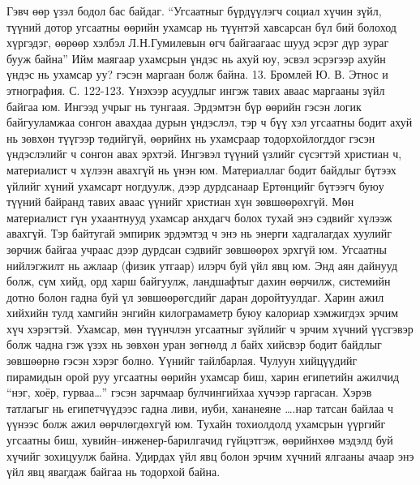 Гэвч өөр үзэл бодол бас байдаг. “Угсаатныг бүрдүүлэгч социал хүчин зүйл, түүний дотор угсаатны өөрийн ухамсар нь түүнтэй хавсарсан бүл бий болоход хүргэдэг, өөрөөр хэлбэл Л.Н.Гумилевын өгч байгаагаас шууд эсрэг дүр зураг бууж байна” Ийм маягаар ухамсрын үндэс нь ахуй юу, эсвэл эсрэгээр ахуйн үндэс нь ухамсар уу? гэсэн маргаан болж байна. 13. Бромлей Ю. В. Этнос и этнография. С. 122-123.
Үнэхээр асуудлыг ингэж тавих аваас маргааны зүйл байгаа юм. Ингээд учрыг нь тунгаая.
Эрдэмтэн бүр өөрийн гэсэн логик байгууламжаа сонгон авахдаа дурын үндэслэл, тэр ч бүү хэл угсаатны бодит ахуй нь зөвхөн түүгээр төдийгүй, өөрийнх нь ухамсраар тодорхойлогддог гэсэн үндэслэлийг ч сонгон авах эрхтэй. Ингэвэл түүний үзлийг сүсэгтэй христиан ч, материалист ч хүлээн авахгүй нь үнэн юм. Материаллаг бодит байдлыг бүтээх үйлийг хүний ухамсарт ногдуулж, дээр дурдсанаар Ертөнцийг бүтээгч буюу түүний байранд тавих аваас үүнийг христиан хүн зөвшөөрөхгүй. Мөн материалист гүн ухаантнууд ухамсар анхдагч болох тухай энэ сэдвийг хүлээж авахгүй.
Тэр байтугай эмпирик эрдэмтэд ч энэ нь энерги хадгалагдах хуулийг зөрчиж байгаа учраас дээр дурдсан сэдвийг зөвшөөрөх эрхгүй юм. Угсаатны нийлэгжилт нь ажлаар (физик утгаар) илэрч буй үйл явц юм. Энд аян дайнууд болж, сүм хийд, орд харш байгуулж, ландшафтыг дахин өөрчилж, системийн дотно болон гадна буй үл зөвшөөрөгсдийг даран доройтуулдаг. Харин ажил хийхийн тулд хамгийн энгийн килограмаметр буюу калориар хэмжигдэх эрчим хүч хэрэгтэй. Ухамсар, мөн түүнчлэн угсаатныг зүйлийг ч эрчим хүчний үүсгэвэр болж чадна гэж үзэх нь зөвхөн уран зөгнөлд л байх хийсвэр бодит байдлыг зөвшөөрнө гэсэн хэрэг болно.
Үүнийг тайлбарлая. Чулуун хийцүүдийг пирамидын орой руу угсаатны өөрийн ухамсар биш, харин египетийн ажилчид “нэг, хоёр, гурваа…” гэсэн зарчмаар булчингийхаа хүчээр гаргасан. Хэрэв татлагыг нь египетчүүдээс гадна ливи, иуби, хананеяне ….нар татсан байлаа ч үүнээс болж ажил өөрчлөгдөхгүй юм. Тухайн тохиолдолд ухамсрын үүргийг угсаатны биш, хувийн–инженер-барилгачид гүйцэтгэж, өөрийнхөө мэдэлд буй хүчийг зохицуулж байна. Удирдах үйл явц болон эрчим хүчний ялгааны ачаар энэ үйл явц явагдаж байгаа нь тодорхой байна.
